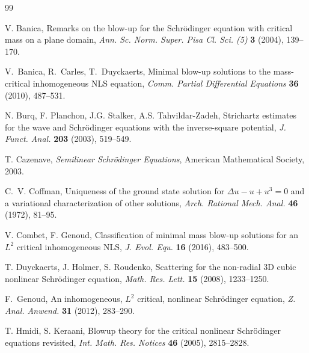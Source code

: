 \documentclass[reqno]{amsart}
\theoremstyle{plain}
\theoremstyle{definition}
\numberwithin{equation}{section}
\begin{document}
\begin{thebibliography}{99}
\small

 V. Banica,
Remarks on the blow-up for the Schr\"odinger equation with 
critical mass on a plane domain,
{\it Ann. Sc. Norm. Super. Pisa Cl. Sci. (5)} {\bf 3} (2004), 139--170.

V.~Banica, R.~Carles, T.~Duyckaerts,
Minimal blow-up solutions to the mass-critical inhomogeneous NLS equation,
{\it Comm. Partial Differential Equations} {\bf 36} (2010), 487--531.

N. Burq, F. Planchon, J.G. Stalker, A.S. Tahvildar-Zadeh, 
Strichartz estimates for the wave and Schr\"odinger equations 
with the inverse-square potential, 
{\it J. Funct. Anal.} {\bf 203} (2003), 519--549.


 T. Cazenave,
{\it Semilinear Schr\"odinger Equations},
American Mathematical Society, 2003.


C.~V. Coffman, 
Uniqueness of the ground state solution for $\Delta u - u +u^3 =0$ 
and a variational characterization of other solutions,
{\it Arch. Rational Mech. Anal.} {\bf 46} (1972), 81--95.

 V. Combet, F. Genoud,
Classification of minimal mass blow-up solutions for an $L^2$ critical inhomogeneous NLS,
{\it J. Evol. Equ.} {\bf 16} (2016), 483--500.

T. Duyckaerts, J. Holmer, S. Roudenko, 
Scattering for the non-radial 3D cubic nonlinear Schr\"odinger equation, 
{\it Math. Res. Lett.} {\bf 15} (2008), 1233--1250.

 F.~Genoud,
An inhomogeneous, $L^2$ critical, nonlinear Schr\"odinger equation,
{\it Z. Anal. Anwend.} {\bf 31} (2012), 283--290.


T. Hmidi, S. Keraani, 
Blowup theory for the critical nonlinear Schr\"odinger equations revisited, 
{\it Int. Math. Res. Notices} {\bf 46} (2005), 2815--2828.


\end{thebibliography}
\end{document}

